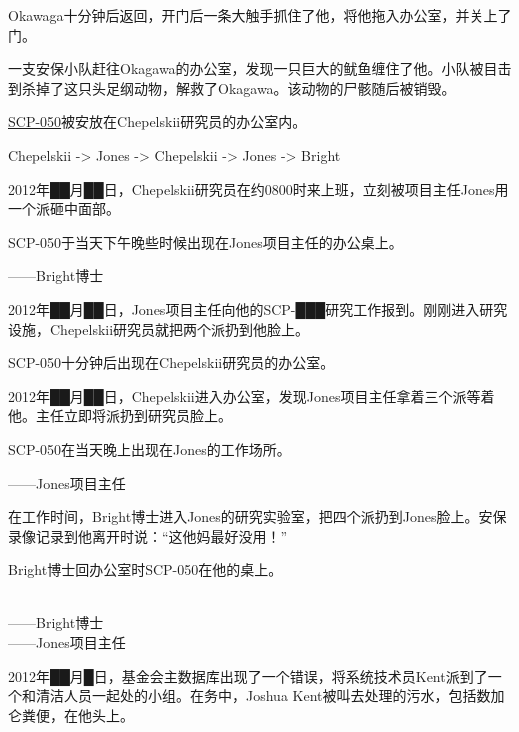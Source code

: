 Okawaga十分钟后返回，开门后一条大触手抓住了他，将他拖入办公室，并关上了门。

一支安保小队赶往Okagawa的办公室，发现一只巨大的鱿鱼缠住了他。小队被目击到杀掉了这只头足纲动物，解救了Okagawa。该动物的尸骸随后被销毁。

\hyperref[chap:SCP-050]{SCP-050}被安放在Chepelskii研究员的办公室内。



Chepelskii -> Jones -> Chepelskii -> Jones -> Bright


2012年██月██日，Chepelskii研究员在约0800时来上班，立刻被项目主任Jones用一个派砸中面部。

SCP-050于当天下午晚些时候出现在Jones项目主任的办公桌上。

——Bright博士


2012年██月██日，Jones项目主任向他的SCP-███研究工作报到。刚刚进入研究设施，Chepelskii研究员就把两个派扔到他脸上。

SCP-050十分钟后出现在Chepelskii研究员的办公室。


2012年██月██日，Chepelskii进入办公室，发现Jones项目主任拿着三个派等着他。主任立即将派扔到研究员脸上。

SCP-050在当天晚上出现在Jones的工作场所。

——Jones项目主任


在工作时间，Bright博士进入Jones的研究实验室，把四个派扔到Jones脸上。安保录像记录到他离开时说：“这他妈最好没用！”

Bright博士回办公室时SCP-050在他的桌上。

\\
——Bright博士\\
——Jones项目主任



2012年██月█日，基金会主数据库出现了一个错误，将系统技术员Kent派到了一个和清洁人员一起处的小组。在务中，Joshua Kent被叫去处理的污水，包括数加仑粪便，在他头上。

